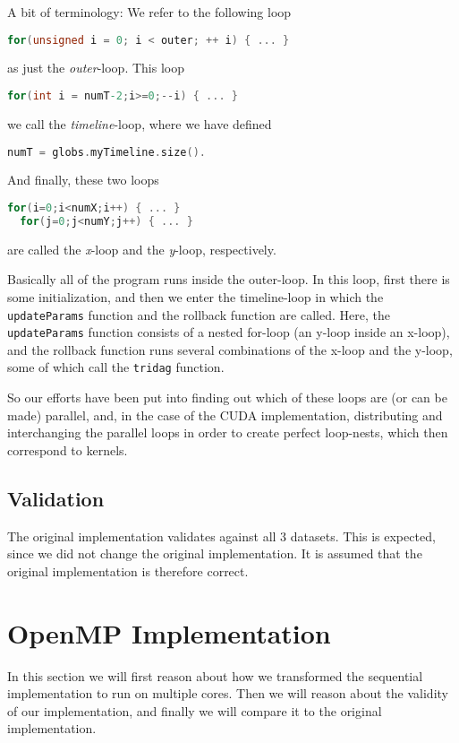 \documentclass[11pt]{article}
\begin{document}
A bit of terminology: We refer to the following loop
\begin{lstlisting}[language=C]
  for(unsigned i = 0; i < outer; ++ i) { ... }
\end{lstlisting}
as just the \emph{outer}-loop. This loop
\begin{lstlisting}[language=C]
  for(int i = numT-2;i>=0;--i) { ... }
\end{lstlisting}
we call the \emph{timeline}-loop, where we have defined
\begin{lstlisting}[language=C]
  numT = globs.myTimeline.size().
\end{lstlisting}
And finally, these two loops
\begin{lstlisting}[language=C]
  for(i=0;i<numX;i++) { ... }
  for(j=0;j<numY;j++) { ... }
\end{lstlisting}
are called the \emph{x}-loop and the \emph{y}-loop, respectively.

Basically all of the program runs inside the outer-loop.
In this loop, first there is some initialization, and then we enter the timeline-loop in which the \texttt{updateParams} function and the rollback function are called.
Here, the \texttt{updateParams} function consists of a nested for-loop (an y-loop inside an x-loop), and the rollback function runs several combinations of the x-loop and the y-loop, some of which call the \texttt{tridag} function.

So our efforts have been put into finding out which of these loops are (or can be made) parallel, and, in the case of the CUDA implementation, distributing and interchanging the parallel loops in order to create perfect loop-nests, which then correspond to kernels.


\subsection{Validation}
The original implementation validates against all 3 datasets. This is expected,
since we did not change the original implementation. It is assumed that the 
original implementation is therefore correct.


\section{OpenMP Implementation}
In this section we will first reason about how we transformed the sequential
implementation to run on multiple cores. Then we will reason about the validity 
of our implementation, and finally we will compare it to the original 
implementation.
\end{document}
